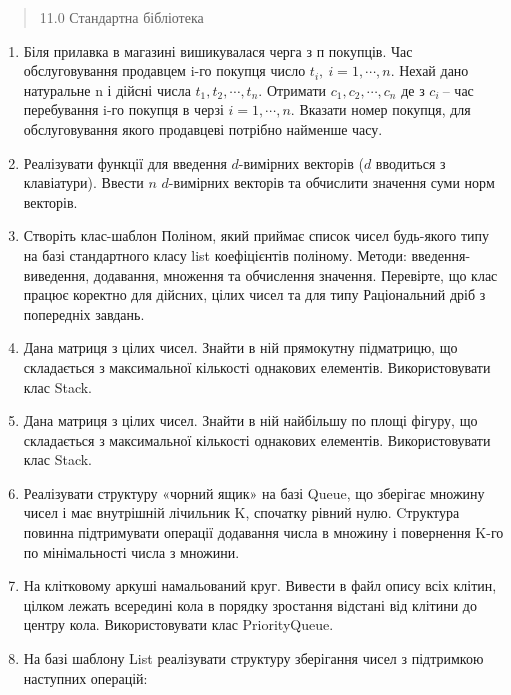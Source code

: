 \documentclass[]{article}
\begin{document}
\begin{quote}
11.0 Стандартна бібліотека
\end{quote}

\begin{enumerate}
\def\labelenumi{\arabic{enumi}.}
\item
  Біля прилавка в магазині вишикувалася черга з п покупців. Час
  обслуговування продавцем i-го покупця число
  \(t_{i},\ i = 1,\cdots,n\). Нехай дано натуральне n і дійсні числа
  \(t_{1},t_{2},\cdots,t_{n}\). Отримати \(c_{1},c_{2},\cdots,c_{n}\) де
  з \(c_{i}\ \)-- час перебування i-го покупця в черзі
  \(i = 1,\cdots,n\). Вказати номер покупця, для обслуговування якого
  продавцеві потрібно найменше часу.
\item
  Реалізувати функції для введення \(d\)-вимірних векторів (\(d\)
  вводиться з клавіатури). Ввести \(n\) \(d\)-вимірних векторів та
  обчислити значення суми норм векторів.
\item
  Створіть клас-шаблон Поліном, який приймає список чисел будь-якого
  типу на базі стандартного класу list коефіцієнтів поліному. Методи:
  введення-виведення, додавання, множення та обчислення значення.
  Перевірте, що клас працює коректно для дійсних, цілих чисел та для
  типу Раціональний дріб з попередніх завдань.
\item
  Дана матриця з цілих чисел. Знайти в ній прямокутну підматрицю, що
  складається з максимальної кількості однакових елементів.
  Використовувати клас Stack.
\item
  Дана матриця з цілих чисел. Знайти в ній найбільшу по площі фігуру, що
  складається з максимальної кількості однакових елементів.
  Використовувати клас Stack.
\item
  Реалізувати структуру «чорний ящик» на базі Queue, що зберігає множину
  чисел і має внутрішній лічильник K, спочатку рівний нулю. Cтруктура
  повинна підтримувати операції додавання числа в множину і повернення
  K-го по мінімальності числа з множини.
\item
  На клітковому аркуші намальований круг. Вивести в файл опису всіх
  клітин, цілком лежать всередині кола в порядку зростання відстані від
  клітини до центру кола. Використовувати клас PriorityQueue.
\item
  На базі шаблону List реалізувати структуру зберігання чисел з
  підтримкою наступних операцій:


\end{enumerate}
\end{document}

